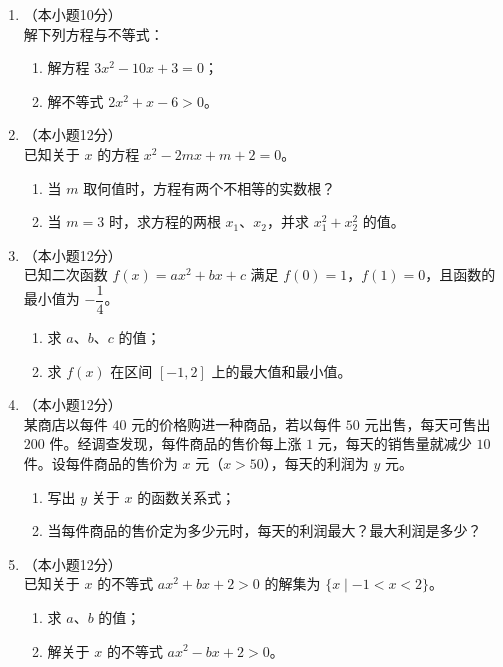 \documentclass[12pt, a4paper]{ctexart}
\begin{document}
\begin{enumerate}[resume]
\item[17.]（本小题10分）\\
解下列方程与不等式：
\begin{enumerate}[(1)]
  \item 解方程 $3x^2-10x+3=0$；
  \item 解不等式 $2x^2+x-6>0$。
\end{enumerate}

\vspace{6cm}

\item[18.]（本小题12分）\\
已知关于 $x$ 的方程 $x^2-2mx+m+2=0$。
\begin{enumerate}[(1)]
  \item 当 $m$ 取何值时，方程有两个不相等的实数根？
  \item 当 $m=3$ 时，求方程的两根 $x_1$、$x_2$，并求 $x_1^2+x_2^2$ 的值。
\end{enumerate}

\vspace{6cm}

\item[19.]（本小题12分）\\
已知二次函数 $f(x)=ax^2+bx+c$ 满足 $f(0)=1$，$f(1)=0$，且函数的最小值为 $-\dfrac{1}{4}$。
\begin{enumerate}[(1)]
  \item 求 $a$、$b$、$c$ 的值；
  \item 求 $f(x)$ 在区间 $[-1,2]$ 上的最大值和最小值。
\end{enumerate}

\vspace{6cm}

\item[20.]（本小题12分）\\
某商店以每件 $40$ 元的价格购进一种商品，若以每件 $50$ 元出售，每天可售出 $200$ 件。经调查发现，每件商品的售价每上涨 $1$ 元，每天的销售量就减少 $10$ 件。设每件商品的售价为 $x$ 元（$x>50$），每天的利润为 $y$ 元。
\begin{enumerate}[(1)]
  \item 写出 $y$ 关于 $x$ 的函数关系式；
  \item 当每件商品的售价定为多少元时，每天的利润最大？最大利润是多少？
\end{enumerate}

\vspace{6cm}

\item[21.]（本小题12分）\\
已知关于 $x$ 的不等式 $ax^2+bx+2>0$ 的解集为 $\{x\mid -1<x<2\}$。
\begin{enumerate}[(1)]
  \item 求 $a$、$b$ 的值；
  \item 解关于 $x$ 的不等式 $ax^2-bx+2>0$。
\end{enumerate}


\end{enumerate}
\end{document}
